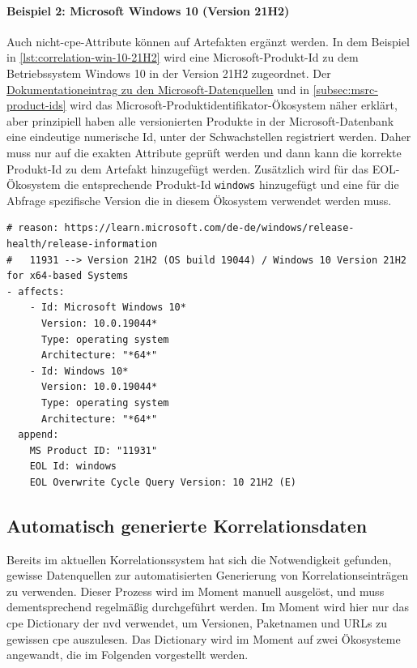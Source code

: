 \paragraph{Beispiel 2: Microsoft Windows 10 (Version 21H2)}
Auch nicht-\acrshort{cpe}-Attribute können auf Artefakten ergänzt werden.
In dem Beispiel in \autoref{lst:correlation-win-10-21H2} wird eine Microsoft-Produkt-Id zu dem Betriebssystem Windows 10 in der Version 21H2 zugeordnet.
Der \href{https://github.com/org-metaeffekt/metaeffekt-documentation/blob/bd184b2889d5421b5a71dcd26c1ac0ffc63d07e7/metaeffekt-vulnerability-management/data-mirror/msrc/understanding-data.md}{Dokumentationeintrag zu den Microsoft-Datenquellen} und in \autoref{subsec:msrc-product-ids} wird das Microsoft-Produktidentifikator-Ökosystem näher erklärt, aber prinzipiell haben alle versionierten Produkte in der Microsoft-Datenbank eine eindeutige numerische Id, unter der Schwachstellen registriert werden.
Daher muss nur auf die exakten Attribute geprüft werden und dann kann die korrekte Produkt-Id zu dem Artefakt hinzugefügt werden.
Zusätzlich wird für das EOL-Ökosystem die entsprechende Produkt-Id \texttt{windows} hinzugefügt und eine für die Abfrage spezifische Version die in diesem Ökosystem verwendet werden muss.

\begin{lstlisting}[style=yaml,caption={Korrelationseintrag für Snappy-Komponenten},label={lst:correlation-win-10-21H2}]
# reason: https://learn.microsoft.com/de-de/windows/release-health/release-information
#   11931 --> Version 21H2 (OS build 19044) / Windows 10 Version 21H2 for x64-based Systems
- affects:
    - Id: Microsoft Windows 10*
      Version: 10.0.19044*
      Type: operating system
      Architecture: "*64*"
    - Id: Windows 10*
      Version: 10.0.19044*
      Type: operating system
      Architecture: "*64*"
  append:
    MS Product ID: "11931"
    EOL Id: windows
    EOL Overwrite Cycle Query Version: 10 21H2 (E)
\end{lstlisting}

\subsection{Automatisch generierte Korrelationsdaten}\label{subsec:old-generated-correlation-data}

Bereits im aktuellen Korrelationssystem hat sich die Notwendigkeit gefunden, gewisse Datenquellen zur automatisierten Generierung von Korrelationseinträgen zu verwenden.
Dieser Prozess wird im Moment manuell ausgelöst, und muss dementsprechend regelmäßig durchgeführt werden.
Im Moment wird hier nur das \acrshort{cpe} Dictionary der \acrshort{nvd} verwendet, um Versionen, Paketnamen und URLs zu gewissen \acrshort{cpe} auszulesen.
Das Dictionary wird im Moment auf zwei Ökosysteme angewandt, die im Folgenden vorgestellt werden.

